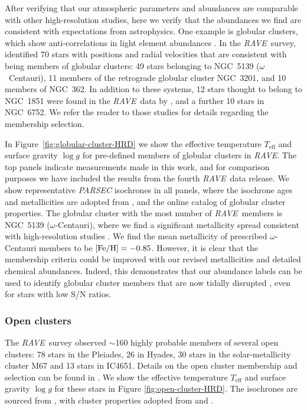 \documentclass[preprint,trackchanges]{aastex}
\newcommand{\acronym}[1]{{\small{#1}}}
\newcommand{\project}[1]{\textsl{#1}}
\newcommand{\rave}{\project{\acronym{RAVE}}}
\newcommand{\teff}{T_{\mathrm{eff}}}
\newcommand{\logg}{\log g}
\begin{document}
After verifying that our atmospheric parameters and abundances are comparable with other
high-resolution studies, here we verify that the abundances we find
are consistent with expectations from astrophysics.  One example is globular clusters, 
which show anti-correlations in light element abundances 
\citep[e.g.,][and references therein]{Norris_Da_Costa_1995,Carretta_2009}.  In the \rave\
survey, \cite{Anguiano_2015} identified 70 stars with positions and radial velocities that are
consistent with being members of globular clusters: 49 stars belonging to NGC~5139
($\omega$~Centauri), 11 members of the retrograde globular cluster NGC~3201, and 10 
members of NGC~362. In addition to these systems, 12 stars thought to belong to NGC~1851
were found in the \rave\ data by \cite{Kunder_2014}, and a further 10 stars in NGC~6752.  
We refer the reader to those studies for details regarding the membership selection.



In Figure~\ref{fig:globular-cluster-HRD} we show the effective temperature
$\teff$ and surface gravity $\logg$ for pre-defined members of globular clusters in \rave.
The top panels indicate measurements made in this work, and for comparison purposes we have included
the results from the fourth \rave\ data release.  We show representative \project{PARSEC} isochrones 
\citep{Bressan_2012} in all panels, where the isochrone ages and metallicities are adopted from
\citet{Kunder_2016,Marin-Franch_2009}, and the \citet[][accessed 6 September 2016]{Harris_1996} 
online catalog of globular cluster properties.  The globular cluster with the most number of
\rave\ members is NGC~5139 ($\omega$-Centauri), where we find a significant metallicity spread
consistent with high-resolution studies \citep{Marino_2011,Carretta_2009,Carretta_2013}.  We
find the mean metallicity of prescribed $\omega$-Centauri members to be $[{\rm Fe/H}] = -0.85$.
However, it is clear that the membership criteria could be improved with our
revised metallicities and detailed chemical abundances. 
Indeed, this demonstrates that our abundance labels can be used to identify
globular cluster members that are now tidally disrupted \citep{Anguiano_2016,Kuzma_2016,Navin_2016},
even for stars with low S/N ratios.


\subsubsection{Open clusters}
\label{sec:open-cluster-validation}

The \rave\ survey observed $\sim$160 highly probable members of several open clusters:
78 stars in the Pleiades, 26 in Hyades, 30 stars in the solar-metallicity cluster
M67 and 13 stars in IC4651. Details on the open cluster membership and selection can 
be found in \cite{Kunder_2016}.  We show the effective temperature $\teff$ and surface
gravity $\logg$ for these stars in Figure \ref{fig:open-cluster-HRD}.  The isochrones
are sourced from \citet{Bressan_2012}, with cluster properties adopted from 
\cite{Kunder_2016} and \cite{Kharchenko_2013}.  
\end{document}
